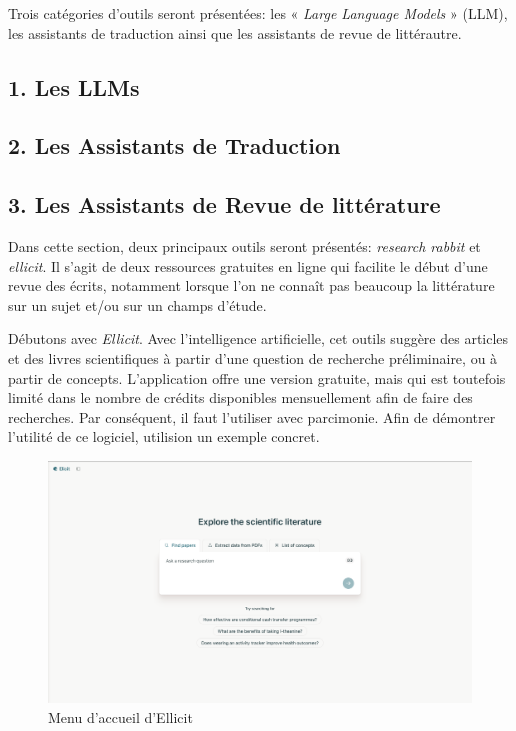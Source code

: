 \documentclass[
  letterpaper,
]{scrbook}
\begin{document}
Trois catégories d'outils seront présentées: les « \emph{Large Language
Models} » (LLM), les assistants de traduction ainsi que les assistants
de revue de littérautre.

\hypertarget{les-llms}{%
\subsection{1. Les LLMs}\label{les-llms}}

\hypertarget{les-assistants-de-traduction}{%
\subsection{2. Les Assistants de
Traduction}\label{les-assistants-de-traduction}}

\hypertarget{les-assistants-de-revue-de-littuxe9rature}{%
\subsection{3. Les Assistants de Revue de
littérature}\label{les-assistants-de-revue-de-littuxe9rature}}

Dans cette section, deux principaux outils seront présentés:
\emph{research rabbit} et \emph{ellicit}. Il s'agit de deux ressources
gratuites en ligne qui facilite le début d'une revue des écrits,
notamment lorsque l'on ne connaît pas beaucoup la littérature sur un
sujet et/ou sur un champs d'étude.

Débutons avec \emph{Ellicit}. Avec l'intelligence artificielle, cet
outils suggère des articles et des livres scientifiques à partir d'une
question de recherche préliminaire, ou à partir de concepts.
L'application offre une version gratuite, mais qui est toutefois limité
dans le nombre de crédits disponibles mensuellement afin de faire des
recherches. Par conséquent, il faut l'utiliser avec parcimonie. Afin de
démontrer l'utilité de ce logiciel, utilision un exemple concret.

\begin{figure}

{\centering \includegraphics{images/chapitre9_image2.png}

}

\caption{\label{fig-ellicit}Menu d'accueil d'Ellicit}

\end{figure}
\end{document}

